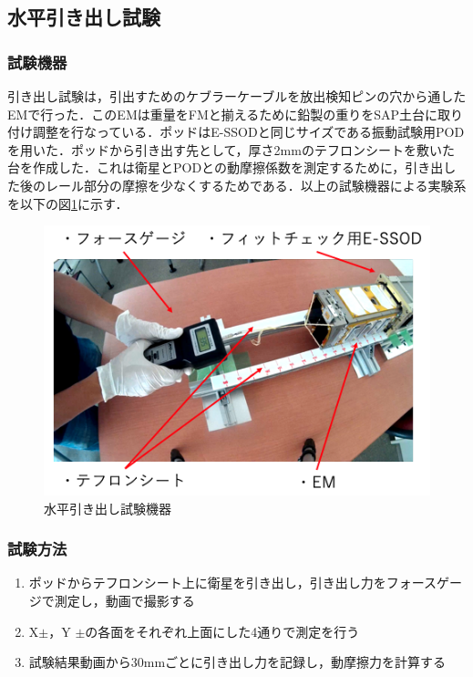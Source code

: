 \subsection{水平引き出し試験}

\subsubsection{試験機器}

引き出し試験は，引出すためのケブラーケーブルを放出検知ピンの穴から通したEMで行った．このEMは重量をFMと揃えるために鉛製の重りをSAP土台に取り付け調整を行なっている．ポッドはE-SSODと同じサイズである振動試験用PODを用いた．ポッドから引き出す先として，厚さ2mmのテフロンシートを敷いた台を作成した．これは衛星とPODとの動摩擦係数を測定するために，引き出した後のレール部分の摩擦を少なくするためである．以上の試験機器による実験系を以下の図\ref{fig:horizontalequipment}に示す．

\begin{figure}[h]
	\begin{center}
		
		\includegraphics[width=0.6\linewidth]{04/fig/horizontalequipment.png}
		\caption{水平引き出し試験機器}
		\label{fig:horizontalequipment}
		
	\end{center}
\end{figure}

\subsubsection{試験方法}

\begin{enumerate}
	\item ポッドからテフロンシート上に衛星を引き出し，引き出し力をフォースゲージで測定し，動画で撮影する
	\item X$\pm$，Y $\pm$の各面をそれぞれ上面にした4通りで測定を行う
	\item 試験結果動画から30mmごとに引き出し力を記録し，動摩擦力を計算する
\end{enumerate}

